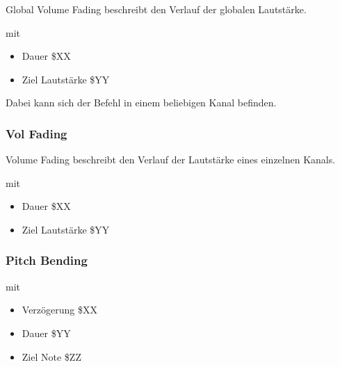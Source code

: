 Global Volume Fading beschreibt den Verlauf der globalen Lautstärke.

\medskip



\medskip

mit

\begin{itemize}
	\item Dauer \$XX 
	\item Ziel Lautstärke \$YY
\end{itemize}

Dabei kann sich der Befehl in einem beliebigen Kanal befinden.

\subsubsection{Vol Fading}

Volume Fading beschreibt den Verlauf der Lautstärke eines einzelnen Kanals.

\medskip



\medskip

mit 

\begin{itemize}
	\item Dauer \$XX
	\item Ziel Lautstärke \$YY 
\end{itemize}

\subsubsection{Pitch Bending}



\medskip



\medskip

mit

\begin{itemize}
	\item Verzögerung \$XX
	\item Dauer \$YY
	\item Ziel Note \$ZZ
\end{itemize}

